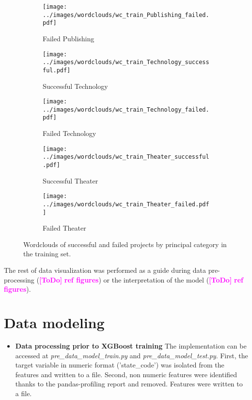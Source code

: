 \documentclass{article}
\newcommand{\ToDo}[1]{\textcolor{magenta}{\textbf{[ToDo]} \textbf{#1}}}
\begin{document}
{\begin{itemize}
\begin{figure}
  \begin{subfigure}[m']{0.2\linewidth}
    \centering\texttt{[image: ../images/wordclouds/wc\_train\_Publishing\_failed.pdf]}
    \caption{Failed Publishing}
    \label{fig:Publishing_f}
  \end{subfigure}
    \begin{subfigure}[n]{0.2\linewidth}
    \centering\texttt{[image: ../images/wordclouds/wc\_train\_Technology\_successful.pdf]}
    \caption{Successful Technology}
    \label{fig:Technology_s}
  \end{subfigure} 
  \begin{subfigure}[n']{0.2\linewidth}
    \centering\texttt{[image: ../images/wordclouds/wc\_train\_Technology\_failed.pdf]}
    \caption{Failed Technology}
    \label{fig:Technology_f}
  \end{subfigure}
    \begin{subfigure}[o]{0.2\linewidth}
    \centering\texttt{[image: ../images/wordclouds/wc\_train\_Theater\_successful.pdf]}
    \caption{Successful Theater}
    \label{fig:Theater_s}
  \end{subfigure} 
  \begin{subfigure}[o']{0.2\linewidth}
    \centering\texttt{[image: ../images/wordclouds/wc\_train\_Theater\_failed.pdf]}
    \caption{Failed Theater}
    \label{fig:Theater_f}
  \end{subfigure}

\caption{Wordclouds of successful and failed projects by principal category in the training set.}
\label{fig:wordclouds}
\end{figure}

The rest of data visualization was performed as a guide during data pre-processing (\ToDo{ref figures}) or the interpretation of the model (\ToDo{ref figures}).

\end{itemize}


\section{Data modeling}
\label{sec:model}
\begin{itemize}
\item \textbf{Data processing prior to XGBoost training}
The implementation can be accessed at \emph{pre\_data\_model\_train.py} and \emph{pre\_data\_model\_test.py}.
First, the target variable in numeric format ('state\_code') was isolated from the features and written to a file.
Second, non numeric features were identified thanks to the pandas-profiling report and removed. Features were written to a file.


\end{itemize}}
\end{document}
